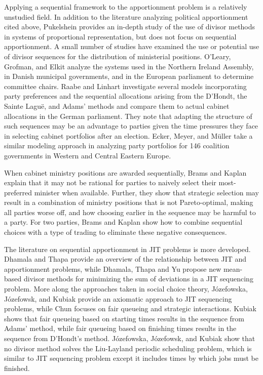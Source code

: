 \documentclass[pdflatex,sn-mathphys-num]{sn-jnl}
\theoremstyle{thmstyleone}%
\theoremstyle{thmstyletwo}%
\theoremstyle{thmstylethree}%
\begin{document}
Applying a sequential framework to the apportionment problem is a relatively unstudied field. In addition to the   literature analyzing political apportionment cited above, Pukelshein \cite{P} provides an in-depth study of the use of divisor methods  in systems of proportional representation, but does not focus on sequential apportionment.  A small number of studies have examined the use or potential use of divisor sequences for the distribution of ministerial positions. O'Leary, Grofman, and Elkit \cite{OGE} analyze  the systems used in the Northern Ireland Assembly,  in Danish municipal governments, and in the European parliament to determine committee chairs.  Raabe and Linhart \cite{RL} investigate  several models  incorporating party preferences and the sequential allocations arising from the D'Hondt, the Sainte Lagu\"e, and Adams' methods and compare them to actual cabinet  allocations in the German parliament. They note that adapting the structure of such sequences may be an advantage to parties given the time pressures they face in selecting cabinet portfolios after an election.  Ecker, Meyer, and M\"uller \cite{EMM}  take a similar modeling approach in analyzing party portfolios for 146 coalition governments in Western and Central Eastern Europe.  

When cabinet ministry positions are awarded sequentially, Brams and Kaplan \cite{BK} explain that it may not be rational for parties to naively select their most-preferred minister when available. Further, they show that strategic selection may result in a combination of ministry positions that is not Pareto-optimal, making all parties worse off, and how choosing earlier in the sequence may be harmful to a party.  For two parties, Brams and Kaplan \cite{BK} show how to combine sequential choices with a type of trading to eliminate these negative consequences.



The literature on sequential apportionment in JIT problems is more developed. Dhamala and Thapa \cite{DT} provide an overview of the relationship between JIT and apportionment problems, while Dhamala, Thapa and Yu \cite{DTY}  propose new mean-based divisor methods for minimizing the sum of deviations in a JIT sequencing problem. More along the approaches taken in social choice theory, J\'{o}zefowska, J\'{o}zefowsk, and  Kubiak \cite{JJK} provide an axiomatic approach to JIT sequencing problems, while Chun \cite{Chun} focuses on fair queueing and strategic interactions. Kubiak \cite{K} shows that fair queueing based on starting times results in the sequence from Adams’ method, while fair queueing based on finishing times results in the sequence from D'Hondt's method.  J\'{o}zefowska, J\'{o}zefowsk, and  Kubiak \cite{JJK09} show that no divisor method solves the  Liu-Layland periodic scheduling problem, which is similar to JIT sequencing problem except it includes times by which jobs must be finished.
\end{document}
